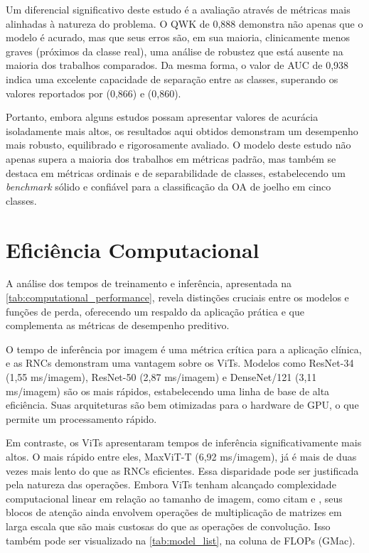 Um diferencial significativo deste estudo é a avaliação através de métricas mais alinhadas à natureza do problema. O QWK de 0,888 demonstra não apenas que o modelo é acurado, mas que seus erros são, em sua maioria, clinicamente menos graves (próximos da classe real), uma análise de robustez que está ausente na maioria dos trabalhos comparados. Da mesma forma, o valor de AUC de 0,938 indica uma excelente capacidade de separação entre as classes, superando os valores reportados por  (0,866) e  (0,860).

Portanto, embora alguns estudos possam apresentar valores de acurácia isoladamente mais altos, os resultados aqui obtidos demonstram um desempenho mais robusto, equilibrado e rigorosamente avaliado. O modelo deste estudo não apenas supera a maioria dos trabalhos em métricas padrão, mas também se destaca em métricas ordinais e de separabilidade de classes, estabelecendo um \textit{benchmark} sólido e confiável para a classificação da OA de joelho em cinco classes.

\section{Eficiência Computacional}

A análise dos tempos de treinamento e inferência, apresentada na \autoref{tab:computational_performance}, revela distinções cruciais entre os modelos e funções de perda, oferecendo um respaldo da aplicação prática e que complementa as métricas de desempenho preditivo.

O tempo de inferência por imagem é uma métrica crítica para a aplicação clínica, e as RNCs demonstram uma vantagem sobre os ViTs. Modelos como ResNet-34 (1,55 ms/imagem), ResNet-50 (2,87 ms/imagem) e DenseNet/121 (3,11 ms/imagem) são os mais rápidos, estabelecendo uma linha de base de alta eficiência. Suas arquiteturas são bem otimizadas para o hardware de GPU, o que permite um processamento rápido.

Em contraste, os ViTs apresentaram tempos de inferência significativamente mais altos. O mais rápido entre eles, MaxViT-T (6,92 ms/imagem), já é mais de duas vezes mais lento do que as RNCs eficientes. Essa disparidade pode ser justificada pela natureza das operações. Embora ViTs tenham alcançado complexidade computacional linear em relação ao tamanho de imagem, como citam  e , seus blocos de atenção ainda envolvem operações de multiplicação de matrizes em larga escala que são mais custosas do que as operações de convolução. Isso também pode ser visualizado na \autoref{tab:model_list}, na coluna de FLOPs (GMac).

